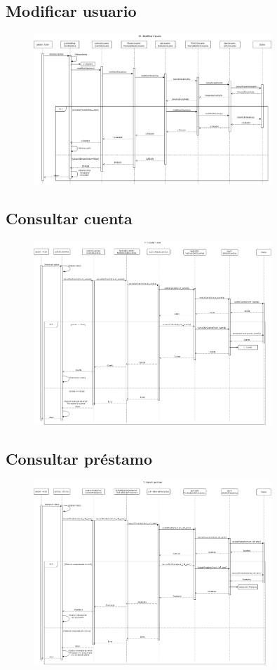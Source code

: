 \documentclass[12pt]{article}
\begin{document}
\subsection{Modificar usuario}
\begin{figure}[H]
    \centering
    \includegraphics[width=0.8\textwidth]{images/10._ModificarUsuario.png}
\end{figure}
\subsection{Consultar cuenta}
\begin{figure}[H]
    \centering
    \includegraphics[width=0.8\textwidth]{images/ConsultaCuenta.png}
\end{figure}
\subsection{Consultar préstamo}
\begin{figure}[H]
    \centering
    \includegraphics[width=0.8\textwidth]{images/consultar_prestamo.png}
\end{figure}
\end{document}
